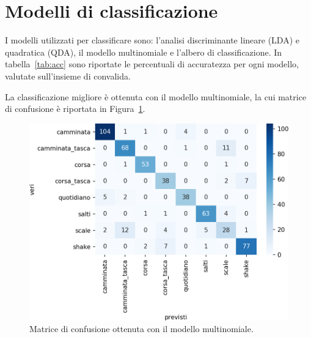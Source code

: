 \documentclass[main.tex]{subfiles}
\begin{document}
\section{Modelli di classificazione}
I modelli utilizzati per classificare sono: l'analisi discriminante lineare (LDA) e quadratica (QDA), il modello multinomiale e l'albero di classificazione. In tabella~\ref{tab:acc} sono riportate le percentuali di accuratezza per ogni modello, valutate sull'insieme di convalida.


La classificazione migliore è ottenuta con il modello multinomiale, la cui matrice di confusione è riportata in Figura~\ref{fig:mn}.
\begin{figure}[H]
	\centering
	\includegraphics[width=\confusion]{../../figure/confusionMatrix-Mn.png}
	\caption{Matrice di confusione ottenuta con il modello multinomiale.}
	\label{fig:mn}
\end{figure}
\end{document}
